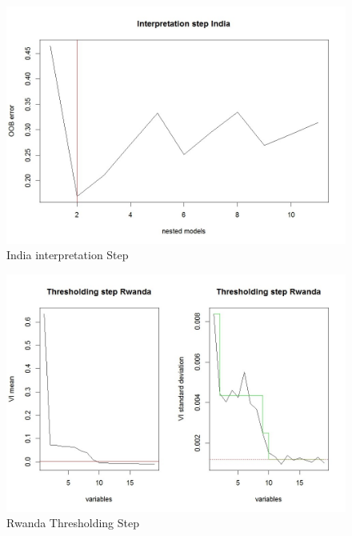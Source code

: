 \documentclass[12pt,a4paper,english]{article}
\begin{document}
\FloatBarrier
\begin{figure}[!htb]
\begin{center}
\includegraphics[scale=0.45]{F2.jpg}
\caption{India interpretation Step }
\label{figure13}
\end{center}
\end{figure}
\FloatBarrier

\FloatBarrier
\begin{figure}[!htb]
\begin{center}
\includegraphics[scale=0.50]{F3.jpg}
\caption{Rwanda Thresholding Step}
\label{figure14}
\end{center}
\end{figure}
\FloatBarrier
\end{document}
